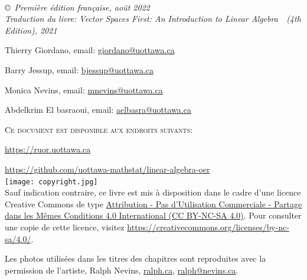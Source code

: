 \documentclass[11pt,french]{book} %
\begin{document}

\newpage
~\vfill
\thispagestyle{empty}



\vspace*{1in}

\noindent \copyright\ \textit{Premi\`ere \'edition fran\c{c}aise, août 2022}\\
\textit{Traduction du livre: \og Vector Spaces First: An Introduction to Linear Algebra\ \fg\ (4th Edition), 2021}


\smallskip
Thierry Giordano, email:
\href{mailto:giordano@uottawa.ca}{giordano@uottawa.ca}



\smallskip
Barry Jessup, email:
\href{mailto:bjessup@uottawa.ca}{bjessup@uottawa.ca}


\smallskip

Monica Nevins, email:
\href{mailto:mnevins@uottawa.ca}{mnevins@uottawa.ca}

\smallskip
Abdelkrim El basraoui, email:
\href{mailto:aelbasra@uottawa.ca}{aelbasra@uottawa.ca}

\smallskip

\noindent \textsc{Ce document est disponible aux endroits suivants:}

\href{https://ruor.uottawa.ca/handle/10393/43430?locale=fr}{https://ruor.uottawa.ca}

\href{https://github.com/uottawa-mathstat/linear-algebra-oer}{https://github.com/uottawa-mathstat/linear-algebra-oer}  \\

%


\noindent \texttt{[image: copyright.jpg]}\\ %



\noindent Sauf indication contraire, ce livre est mis à disposition dans le cadre d'une licence Creative Commons de type \href{https://creativecommons.org/licenses/by-nc-sa/4.0/}{Attribution - Pas d’Utilisation Commerciale - Partage dans les Mêmes Conditions 4.0 International (CC BY-NC-SA 4.0)}.  Pour consulter une copie de cette licence, visitez \url{https://creativecommons.org/licenses/by-nc-sa/4.0/}.

Les photos utilisées dans les titres des chapitres sont reproduites avec la permission de l'artiste, Ralph Nevins, \url{ralph.ca}, \href{mailto:ralph@nevins.ca}{ralph@nevins.ca}.
\end{document}
